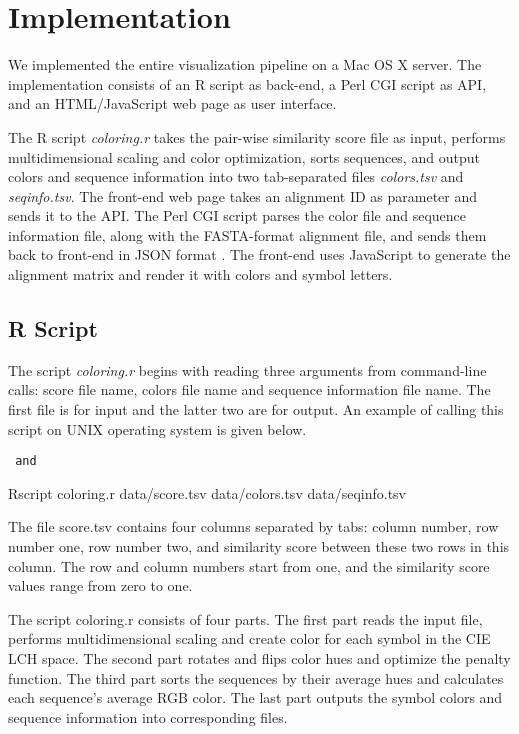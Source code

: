 \chapter{Implementation}\label{chap:Implementation}

We implemented the entire visualization pipeline on a Mac OS X server. The implementation consists of an R script as back-end, a Perl CGI script as API, and an HTML/JavaScript web page as user interface.

The R script \emph{coloring.r} takes the pair-wise similarity score file as input, performs multidimensional scaling and color optimization, sorts sequences, and output colors and sequence information into two tab-separated files \emph{colors.tsv} and \emph{seqinfo.tsv}. The front-end web page takes an alignment ID as parameter and sends it to the API. The Perl CGI script parses the color file and sequence information file, along with the FASTA-format alignment file, and sends them back to front-end in JSON format \cite{crockford2006application}. The front-end uses JavaScript to generate the alignment matrix and render it with colors and symbol letters.

\section{R Script}

The script \emph{coloring.r} begins with reading three arguments from command-line calls: score file name, colors file name and sequence information file name. The first file is for input and the latter two are for output. An example of calling this script on UNIX operating system is given below.
\begin{verbatim} and \end{verbatim}
Rscript coloring.r data/score.tsv data/colors.tsv data/seqinfo.tsv

The file score.tsv contains four columns separated by tabs: column number, row number one, row number two, and similarity score between these two rows in this column. The row and column numbers start from one, and the similarity score values range from zero to one.

The script coloring.r consists of four parts. The first part reads the input file, performs multidimensional scaling and create color for each symbol in the CIE LCH space. The second part rotates and flips color hues and optimize the penalty function. The third part sorts the sequences by their average hues and calculates each sequence’s average RGB color. The last part outputs the symbol colors and sequence information into corresponding files.

